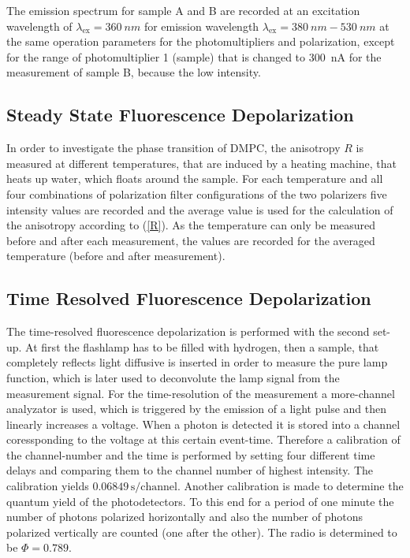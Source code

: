 \documentclass{scrartcl}
\numberwithin{equation}{section}
\numberwithin{figure}{section}
\numberwithin{table}{section}
\newcommand{\Formel}[1]{(\ref{#1})}
\begin{document}
The emission spectrum for sample A and B are recorded at an excitation wavelength of $\lambda_\text{ex}=\SI{360}{nm}$ for emission wavelength $\lambda_\text{ex}=\SI{380}{nm} - \SI{530}{nm}$ at the same operation parameters for the photomultipliers and polarization, except for the range of photomultiplier 1 (sample) that is changed to \SI{300}{nA} for the measurement of sample B, because the low intensity.

\subsection{Steady State Fluorescence Depolarization}
In order to investigate the phase transition of DMPC, the anisotropy $R$  is measured at different temperatures, that are induced by a heating machine, that heats up water, which floats around the sample. For each temperature and all four combinations of polarization filter configurations of the two polarizers five intensity values are recorded and the average value is used for the calculation of the anisotropy according to \Formel{R}. As the temperature can only be measured before and after each measurement, the values are recorded for the averaged temperature (before and after measurement).

\subsection{Time Resolved Fluorescence Depolarization}
The time-resolved fluorescence depolarization is performed with the second set-up. At first the flashlamp has to be filled with hydrogen, then a sample, that completely reflects light diffusive is inserted in order to measure the pure lamp function, which is later used to deconvolute the lamp signal from the measurement signal. For the time-resolution of the measurement a more-channel analyzator is used, which is triggered by the emission of a light pulse and then linearly increases a voltage. When a photon is detected it is stored into a channel coressponding to the voltage at this certain event-time. Therefore a calibration of the channel-number and the time is performed by setting four different time delays and comparing them to the channel number of highest intensity. The calibration yields $0.06849 \, \text{s}/\text{channel}$. Another calibration is made to determine the quantum yield of the photodetectors. To this end for a period of one minute the number of photons polarized horizontally and also the number of photons polarized vertically are counted (one after the other). The radio is determined to be $\Phi = 0.789$. 
\end{document}
